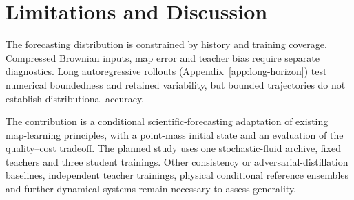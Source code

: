 \section{Limitations and Discussion}
The forecasting distribution is constrained by history and training coverage. Compressed Brownian inputs, map error and teacher bias require separate diagnostics. Long autoregressive rollouts (Appendix~\ref{app:long-horizon}) test numerical boundedness and retained variability, but bounded trajectories do not establish distributional accuracy. 

The contribution is a conditional scientific-forecasting adaptation of existing map-learning principles, with a point-mass initial state and an evaluation of the quality--cost tradeoff. The planned study uses one stochastic-fluid archive, fixed teachers and three student trainings. Other consistency or adversarial-distillation baselines, independent teacher trainings, physical conditional reference ensembles and further dynamical systems remain necessary to assess generality. 
